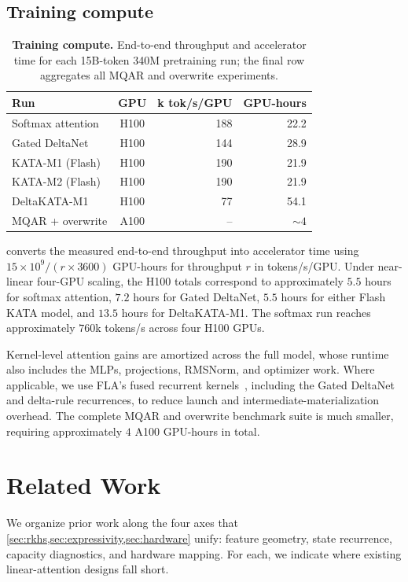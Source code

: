 \documentclass{article}
\newcommand{\1}{\bm{1}}
\theoremstyle{definition}
\begin{document}
\subsection{Training compute}
\label{ssec:training-compute}
\begin{table}[H]
  \centering
  \footnotesize
  \setlength{\tabcolsep}{3.5pt}
  \begin{tabular}{lcrr}
    \toprule
    Run & GPU & \multicolumn{1}{c}{k tok/s/GPU} & \multicolumn{1}{c}{GPU-hours} \\
    \midrule
    Softmax attention & H100 & 188 & 22.2 \\
    Gated DeltaNet & H100 & 144 & 28.9 \\
    KATA-M1 (Flash) & H100 & 190 & 21.9 \\
    KATA-M2 (Flash) & H100 & 190 & 21.9 \\
    DeltaKATA-M1 & H100 & 77 & 54.1 \\
    \midrule
    MQAR + overwrite & A100 & {--} & $\sim\!4$ \\
    \bottomrule
  \end{tabular}
  \caption{\textbf{Training compute.} End-to-end throughput and accelerator time for each
  15B-token 340M pretraining run; the final row aggregates all MQAR and overwrite experiments.}
  \label{tab:training-times}
\end{table}


 converts the measured end-to-end throughput into accelerator time using
$15\times10^9/(r\times3600)$ GPU-hours for throughput $r$ in tokens/s/GPU. Under near-linear
four-GPU scaling, the H100 totals correspond to approximately $5.5$ hours for softmax attention,
$7.2$ hours for Gated DeltaNet, $5.5$ hours for either Flash KATA model, and $13.5$ hours for
DeltaKATA-M1. The softmax run reaches approximately $760$k tokens/s across four H100 GPUs.

Kernel-level attention gains are amortized across the full model, whose runtime also includes the
MLPs, projections, RMSNorm, and optimizer work. Where applicable, we use FLA's fused recurrent
kernels~\citep{yang24fla}, including the Gated DeltaNet and delta-rule recurrences, to reduce launch
and intermediate-materialization overhead. The complete MQAR and overwrite benchmark suite is much
smaller, requiring approximately $4$ A100 GPU-hours in total.


\section{Related Work} \label{sec:related}
We organize prior work along the four axes that \cref{sec:rkhs,sec:expressivity,sec:hardware}
unify: feature geometry, state recurrence, capacity diagnostics, and hardware mapping. For each, we
indicate where existing linear-attention designs fall short.
\end{document}
